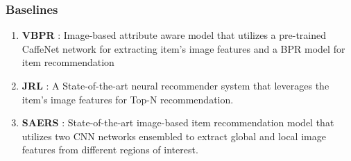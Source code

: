 \documentclass[sigconf,natbib=true]{acmart}
\begin{document}
\subsubsection{Baselines}
\begin{enumerate}
 \item \textbf{VBPR} \cite{he2016vbpr}: Image-based attribute aware model that utilizes a pre-trained CaffeNet network for extracting item's image features and a BPR model for item recommendation
 \item \textbf{JRL} \cite{zhang2017joint}: A State-of-the-art neural recommender system that leverages the item's image features for Top-N recommendation.
  \item \textbf{SAERS} \cite{ijcai2019650}: State-of-the-art image-based item recommendation model that utilizes two CNN networks ensembled to extract global and local image features from different regions of interest.
\end{enumerate}
\end{document}
